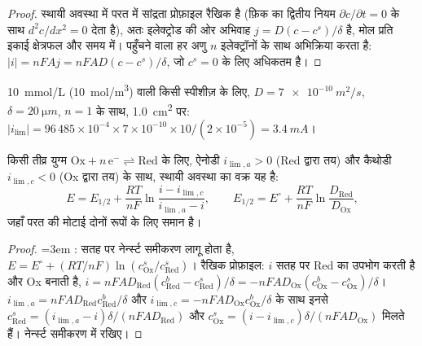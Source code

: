 \begin{proof}
स्थायी अवस्था में परत में सांद्रता प्रोफ़ाइल रैखिक है (फ़िक का
द्वितीय नियम $\partial c/\partial t = 0$ के साथ $d^2c/dx^2 = 0$ देता है), अतः इलेक्ट्रोड
की ओर अभिवाह $j = D(c - c^s)/\delta$ है, मोल प्रति इकाई क्षेत्रफल और
समय में। पहुँचने वाला हर अणु $n$ इलेक्ट्रॉनों के साथ अभिक्रिया करता है: $|i| = nFAj =
nFAD(c - c^s)/\delta$, जो $c^s = 0$ के लिए अधिकतम है।
\end{proof}

\begin{example}[सीमांत धारा का परिमाण]\label{ex:b2:current-potential-curves:ilim}
\qty{10}{mmol/L} (\qty{10}{mol/m^3}) वाली किसी स्पीशीज़ के लिए, $D =
\qty{7e-10}{m^2/s}$, $\delta = \qty{20}{\micro m}$, $n = 1$ के साथ,
\qty{1.0}{cm^2} पर: $|i_{\lim}| = 96\,485 \times 10^{-4} \times 7 \times 10^{-10}
\times 10/(2 \times 10^{-5}) = \qty{3.4}{mA}$।
\end{example}

\begin{theorem}[तीव्र निकाय की तरंग]\label{thm:b2:current-potential-curves:wave}
किसी तीव्र युग्म $\mathrm{Ox} + n\,\mathrm e^- \rightleftharpoons \mathrm{Red}$ के लिए,
ऐनोडी  $i_{\lim,a} > 0$ (Red द्वारा तय) और कैथोडी
 $i_{\lim,c} < 0$ (Ox द्वारा तय) के साथ, स्थायी अवस्था का वक्र यह है:
\[
  E = E_{1/2} + \frac{RT}{nF}\ln\frac{i - i_{\lim,c}}{i_{\lim,a} - i},
  \qquad E_{1/2} = E^\circ + \frac{RT}{nF}\ln\frac{D_{\text{Red}}}{D_{\text{Ox}}} ,
\]
जहाँ परत की मोटाई दोनों रूपों के लिए समान है।
\end{theorem}

\begin{proof}\emergencystretch=3em
: सतह पर नेर्न्स्ट समीकरण लागू होता है, $E = E^\circ + (RT/nF)
\ln(c^s_{\text{Ox}}/c^s_{\text{Red}})$। रैखिक प्रोफ़ाइल:  $i$
सतह पर Red का उपभोग करती है और Ox बनाती है, $i = nFAD_{\text{Red}}(c^b_{\text{Red}}
- c^s_{\text{Red}})/\delta = -nFAD_{\text{Ox}}(c^b_{\text{Ox}} - c^s_{\text{Ox}})/\delta$।
$i_{\lim,a} = nFAD_{\text{Red}}c^b_{\text{Red}}/\delta$ और $i_{\lim,c} =
-nFAD_{\text{Ox}}c^b_{\text{Ox}}/\delta$ के साथ इनसे $c^s_{\text{Red}} = (i_{\lim,a} -
i)\delta/(nFAD_{\text{Red}})$ और $c^s_{\text{Ox}} = (i - i_{\lim,c})\delta/(nFAD_{\text{Ox}})$ मिलते हैं।
नेर्न्स्ट समीकरण में रखिए।
\end{proof}

